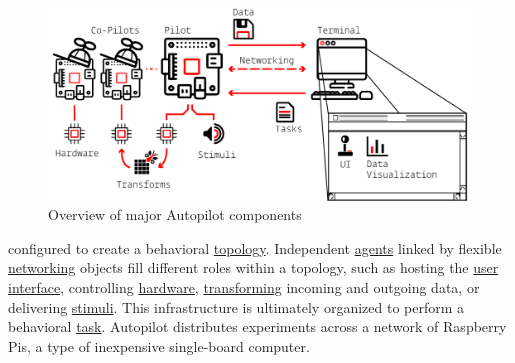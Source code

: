 \begin{figure}
\includegraphics[]{figures/whole_system_black.pdf}
\caption{Overview of major Autopilot components}
\end{figure}

\break configured to create a behavioral \hyperref[sec:topology]{topology}. Independent \hyperref[sec:agents]{agents} linked by flexible \hyperref[sec:networking]{networking} objects fill different roles within a topology, such as hosting the \hyperref[sec:ui]{user interface}, controlling \hyperref[sec:hardware]{hardware}, \hyperref[sec:transforms]{transforming} incoming and outgoing data, or delivering \hyperref[sec:stim]{stimuli}. This infrastructure is ultimately organized to perform a behavioral \hyperref[sec:tasks]{task}. Autopilot distributes experiments across a network of Raspberry Pis, a type of inexpensive single-board computer.